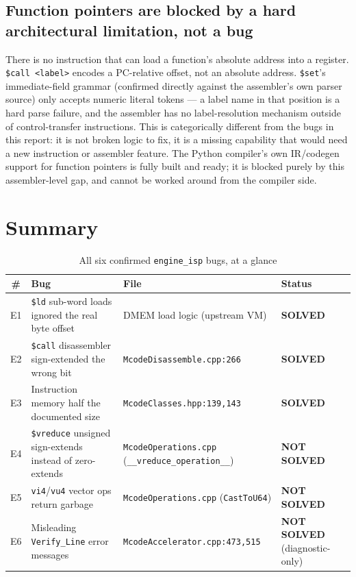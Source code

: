 \documentclass[11pt,a4paper]{report}
\begin{document}
\section{Function pointers are blocked by a hard architectural limitation, not a bug}
There is no instruction that can load a function's absolute address into a register.
\texttt{\$call <label>} encodes a PC-relative offset, not an absolute address. \texttt{\$set}'s
immediate-field grammar (confirmed directly against the assembler's own parser source)
only accepts numeric literal tokens --- a label name in that position is a hard parse
failure, and the assembler has no label-resolution mechanism outside of control-transfer
instructions. This is categorically different from the bugs in this report: it is not
broken logic to fix, it is a missing capability that would need a new instruction or
assembler feature. The Python compiler's own IR/codegen support for function pointers is
fully built and ready; it is blocked purely by this assembler-level gap, and cannot be
worked around from the compiler side.

\chapter{Summary}

\begin{table}[h]
\centering
\caption{All six confirmed \texttt{engine\_isp} bugs, at a glance}
\small
\begin{tabular}{@{}cp{5.0cm}p{4.0cm}p{2.6cm}@{}}
\toprule
\# & Bug & File & Status \\
\midrule
E1 & \texttt{\$ld} sub-word loads ignored the real byte offset & DMEM load logic (upstream VM) & \textbf{SOLVED} \\
E2 & \texttt{\$call} disassembler sign-extended the wrong bit & \texttt{McodeDisassemble.cpp:266} & \textbf{SOLVED} \\
E3 & Instruction memory half the documented size & \texttt{McodeClasses.hpp:139,143} & \textbf{SOLVED} \\
E4 & \texttt{\$vreduce} unsigned sign-extends instead of zero-extends & \texttt{McodeOperations.cpp} (\texttt{\_\_vreduce\_operation\_\_}) & \textbf{NOT SOLVED} \\
E5 & \texttt{vi4}/\texttt{vu4} vector ops return garbage & \texttt{McodeOperations.cpp} (\texttt{CastToU64}) & \textbf{NOT SOLVED} \\
E6 & Misleading \texttt{Verify\_Line} error messages & \texttt{McodeAccelerator.cpp:473,515} & \textbf{NOT SOLVED} (diagnostic-only) \\
\bottomrule
\end{tabular}
\end{table}
\end{document}
